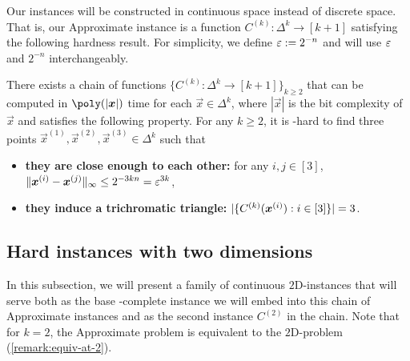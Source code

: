 Our instances will be constructed in continuous space instead of discrete space. 
That is, our \outofk Approximate \Sperner instance is a function $C^{(k)}: \Delta^{k} \to [k+1]$ satisfying the following hardness result.
For simplicity, we define $\varepsilon:= 2^{-n}$ and will use $\varepsilon$ and $2^{-n}$ interchangeably. 
\begin{theorem}
    \label{thm:continuous-asymmetry-main}
    There exists a chain of functions $\{C^{(k)}: \Delta^k \to [k+1]\}_{k\geq 2}$ that can be computed in $\poly(|\vec{x}|)$ time for each $\vec{x}\in \Delta^k$, where $|\vec{x}|$ is the bit complexity of $\vec{x}$ and satisfies the following property. 
    For any $k\geq 2$, it is \PPAD-hard to find three points $\vec{x}^{(1)}, \vec{x}^{(2)}, \vec{x}^{(3)}\in \Delta^{k}$ such that 
    \begin{itemize}[itemsep=0.2em, topsep=0.5em]
        \item {\bf they are close enough to each other:} for any $i,j\in [3]$, $\| {\boldsymbol{x}^{(i)}-\boldsymbol{x}^{(j)}} \|_{\infty}\leq 2^{-3kn}=\varepsilon^{3k}$, 
        \item {\bf they induce a trichromatic triangle:} $|\{{C^{(k)}(\boldsymbol{x}^{(i)}):i\in [3]} \}|=3$. 
    \end{itemize}
\end{theorem}

\subsection{Hard instances with two dimensions}
\label{subsec:warmup-2d}
In this subsection, we will present a family of continuous $2${\rm D}-\Sperner instances that will serve both as the base \PPAD-complete instance we will embed into this chain of \outofk Approximate \Sperner instances and as the second instance $C^{(2)}$ in the chain.
Note that for $k=2$, the \outofk Approximate \Sperner problem is equivalent to the $2${\rm D}-\Sperner problem (\cref{remark:equiv-at-2}).

